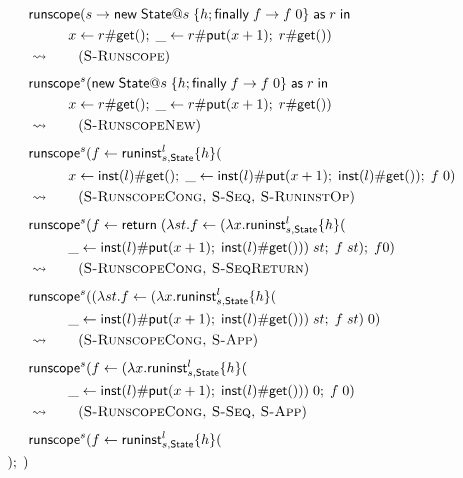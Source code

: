 {\begin{align*}
&\chandlen{s}{\cnew{\mathsf{State}}{s}{\handler ; \hfinally{f}{\capp{f}{0}}}{r}{\\
	&\hspace{1cm} \cdo{x}{\cop{r}{\mathsf{get}}{}}{\cdo{\_}{\cop{r}{\mathsf{put}}{x + 1}}{\cop{r}{\mathsf{get}}{}}}}} \\
& \opsem{} \tag{\textsc{S-Runscope}} \\
& \chandlec{s}{\cnew{\mathsf{State}}{s}{\handler ; \hfinally{f}{\capp{f}{0}}}{r}{\\
	&\hspace{1cm} \cdo{x}{\cop{r}{\mathsf{get}}{}}{\cdo{\_}{\cop{r}{\mathsf{put}}{x + 1}}{\cop{r}{\mathsf{get}}{}}}}} \\
& \opsem{} \tag{\textsc{S-RunscopeNew}} \\
& \chandlec{s}{\cdo{f}{\chandlei{l}{s,\mathsf{State}}{h}{\\
	&\hspace{1cm} \cdo{x}{\cop{\vinst{l}}{\mathsf{get}}{}}{\cdo{\_}{\cop{\vinst{l}}{\mathsf{put}}{x + 1}}{\cop{\vinst{l}}{\mathsf{get}}{}}}}}{\capp{f}{0}}} \\
& \opsem{} \tag{\textsc{S-RunscopeCong, S-Seq, S-RuninstOp}} \\
& \chandlec{s}{\cdo{f}{\creturn{(\vabs{st}{\cdo{f}{\capp{(\vabs{x}{\chandlei{l}{s,\mathsf{State}}{h}{\\
	&\hspace{1cm} \cdo{\_}{\cop{\vinst{l}}{\mathsf{put}}{x + 1}}{\cop{\vinst{l}}{\mathsf{get}}{}}}})}{st}}{\capp{f}{st}}})}}{f 0}} \\
& \opsem{} \tag{\textsc{S-RunscopeCong, S-SeqReturn}} \\
& \chandlec{s}{\capp{(\vabs{st}{\cdo{f}{\capp{(\vabs{x}{\chandlei{l}{s,\mathsf{State}}{h}{\\
	&\hspace{1cm} \cdo{\_}{\cop{\vinst{l}}{\mathsf{put}}{x + 1}}{\cop{\vinst{l}}{\mathsf{get}}{}}}})}{st}}{\capp{f}{st}}})}{0}} \\
& \opsem{} \tag{\textsc{S-RunscopeCong, S-App}} \\
& \chandlec{s}{\cdo{f}{\capp{(\vabs{x}{\chandlei{l}{s,\mathsf{State}}{h}{\\
	&\hspace{1cm} \cdo{\_}{\cop{\vinst{l}}{\mathsf{put}}{x + 1}}{\cop{\vinst{l}}{\mathsf{get}}{}}}})}{0}}{\capp{f}{0}}} \\
& \opsem{} \tag{\textsc{S-RunscopeCong, S-Seq, S-App}} \\
& \chandlec{s}{\cdo{f}{\chandlei{l}{s,\mathsf{State}}{h}{\\
}}}
\end{align*}}
